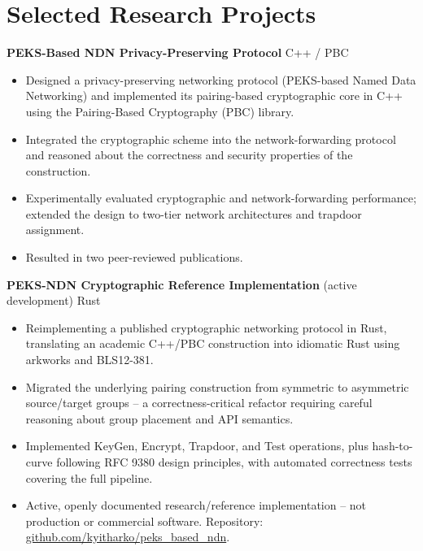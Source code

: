 \section{Selected Research Projects}

\textbf{PEKS-Based NDN Privacy-Preserving Protocol} \hfill C++ / PBC
\begin{itemize}
	\item Designed a privacy-preserving networking protocol (PEKS-based Named Data Networking) and implemented its pairing-based cryptographic core in C++ using the Pairing-Based Cryptography (PBC) library.
	\item Integrated the cryptographic scheme into the network-forwarding protocol and reasoned about the correctness and security properties of the construction.
	\item Experimentally evaluated cryptographic and network-forwarding performance; extended the design to two-tier network architectures and trapdoor assignment.
	\item Resulted in two peer-reviewed publications.
\end{itemize}

\textbf{PEKS-NDN Cryptographic Reference Implementation} (active development) \hfill Rust
\begin{itemize}
	\item Reimplementing a published cryptographic networking protocol in Rust, translating an academic C++/PBC construction into idiomatic Rust using arkworks and BLS12-381.
	\item Migrated the underlying pairing construction from symmetric to asymmetric source/target groups -- a correctness-critical refactor requiring careful reasoning about group placement and API semantics.
	\item Implemented KeyGen, Encrypt, Trapdoor, and Test operations, plus hash-to-curve following RFC 9380 design principles, with automated correctness tests covering the full pipeline.
	\item Active, openly documented research/reference implementation -- not production or commercial software. Repository: \href{https://github.com/kyitharko/peks_based_ndn}{github.com/kyitharko/peks\_based\_ndn}.
\end{itemize}
